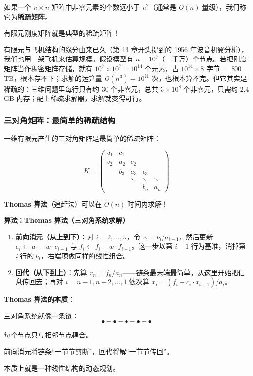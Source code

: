 \begin{definition}[稀疏矩阵]
如果一个 $n \times n$ 矩阵中非零元素的个数远小于 $n^2$（通常是 $O(n)$ 量级），我们称它为\textbf{稀疏矩阵}。
\end{definition}

有限元刚度矩阵就是典型的稀疏矩阵！

\begin{example}[波音787的有限元模型]
有限元与飞机结构的缘分由来已久（第 13 章开头提到的 1956 年波音机翼分析），我们也用一架飞机来估算规模。假设模型有 $n = 10^7$（一千万）个节点。若把刚度矩阵当作稠密矩阵存储，就有 $10^7 \times 10^7 = 10^{14}$ 个元素，占 $10^{14} \times 8$ 字节 $= 800$ TB，根本存不下；求解的运算量 $O(n^3) = 10^{21}$ 次，也根本算不完。但它其实是稀疏的：三维问题里每行只有约 30 个非零元，总共 $3 \times 10^8$ 个非零元，只需约 $2.4$ GB 内存；配上稀疏求解器，求解就变得可行。
\end{example}

\subsubsection*{三对角矩阵：最简单的稀疏结构}

一维有限元产生的三对角矩阵是最简单的稀疏矩阵：

\[
K = \begin{pmatrix}
a_1 & c_1 & & & \\
b_2 & a_2 & c_2 & & \\
& b_3 & a_3 & c_3 & \\
& & \ddots & \ddots & \ddots \\
& & & b_n & a_n
\end{pmatrix}
\]

\textbf{Thomas 算法}（追赶法）可以在 $O(n)$ 时间内求解！

\noindent\textbf{算法：Thomas 算法（三对角系统求解）}

\begin{enumerate}
  \item \textbf{前向消元（从上到下）}：对 $i=2,\dots,n$，令 $w = b_i / a_{i-1}$，然后更新 $a_i \leftarrow a_i - w \cdot c_{i-1}$ 与 $f_i \leftarrow f_i - w \cdot f_{i-1}$。这一步以第 $i-1$ 行为基准，消掉第 $i$ 行的 $b_i$，右端项做同样的线性组合。
  \item \textbf{回代（从下到上）}：先算 $x_n = f_n / a_n$——链条最末端最简单，从这里开始把信息传回去；再对 $i = n-1, n-2, \dots, 1$ 依次算 $x_i = (f_i - c_i \cdot x_{i+1}) / a_i$。
\end{enumerate}

\begin{insightbox}
\textbf{Thomas 算法的本质}：

三对角系统就像一条链：
\[
\bullet - \bullet - \bullet - \bullet - \bullet
\]

每个节点只与相邻节点耦合。

前向消元将链条“一节节剪断”，回代将解“一节节传回”。

本质上就是一种线性结构的动态规划。
\end{insightbox}


